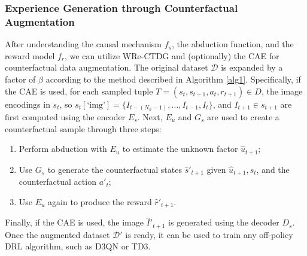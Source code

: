 \subsubsection{Experience Generation through Counterfactual Augmentation}

After understanding the causal mechanism \( f_s \),
the abduction function, and the reward model \( f_r \),
we can utilize WRe-CTDG and (optionally) the CAE
for counterfactual
data augmentation. The original dataset \( \mathcal{D} \)
is expanded by a factor of \( \beta \)
according to the method described in Algorithm \ref{alg1}.
Specifically, if the CAE is used, for each sampled tuple
\( T = (s_t, s_{t+1}, a_t, r_{t+1}) \in D \),
the image encodings in $s_t$, so
\( s_t[\text{`img'}] = \{I_{t-(N_{\mathcal{S}}-1)}, \ldots, I_{t-1}, I_t\} \),
and \( I_{t+1} \in s_{t+1} \) are first computed using
the encoder \( E_s \). Next, \( E_u \) and \( G_s \)
are used to create a counterfactual
sample through three steps:
\begin{enumerate}
    \item Perform abduction with \( E_u \) to estimate
    the unknown factor \( \hat{u}_{t+1} \);
    \item Use \( G_s \) to generate the counterfactual
    states \( \hat{s}'_{t+1} \) given
    \( \hat{u}_{t+1}, s_t \), and the counterfactual
    action \( a'_t \);
    \item Use \( E_u \) again to produce the reward
    \( \hat{r}'_{t+1} \).
\end{enumerate}

Finally, if the CAE is used,
the image \( \hat{I}'_{t+1} \) is generated using
the decoder \( D_s \). Once the augmented dataset
\( \mathcal{D}' \)
is ready, it can be used to train any off-policy DRL
algorithm, such as D3QN or TD3.

\vspace{2cm}

